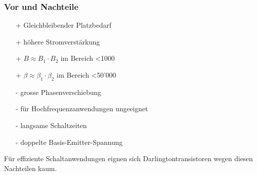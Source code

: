 \subsubsection{Vor und Nachteile}
\vspace{-0.5cm}
\begin{multicols}{2}
    \begin{minipage}{\linewidth}
        \begin{itemize}
            \item [+] Gleichbleibender Platzbedarf
            \item [+] höhere Stromverstärkung
            \item [+] $ B \approx B_1 \cdot B_2 $ im Bereich <1000 
            \item [+] $ \beta \approx \beta_1 \cdot \beta_2 $ im Bereich <50'000
        \end{itemize}
    \end{minipage}
    
    \begin{minipage}{1.2\linewidth}
        \begin{itemize}
            \item [-] grosse Phasenverschiebung
            \item [-] für Hochfrequenzanwendungen ungeeignet
            \item [-] langsame Schaltzeiten
            \item [-] doppelte Basis-Emitter-Spannung
        \end{itemize}
    \end{minipage}
\end{multicols}
Für effiziente Schaltanwendungen eignen sich Darlingtontransistoren wegen diesen Nachteilen kaum.
 \vspace{-0.2cm}

